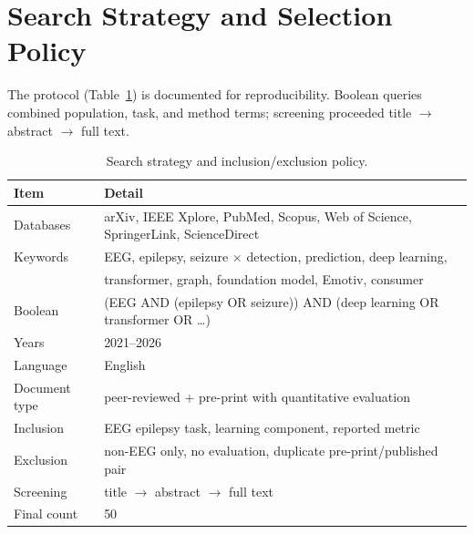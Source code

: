 \section{Search Strategy and Selection Policy}
The protocol (Table~\ref{tab:search}) is documented for reproducibility. Boolean queries combined population, task, and method terms; screening proceeded title $\rightarrow$ abstract $\rightarrow$ full text.
\begin{table}[t]\centering\caption{Search strategy and inclusion/exclusion policy.}\label{tab:search}
\footnotesize\begin{tabular}{ll}\toprule
Item & Detail\\\midrule
Databases & arXiv, IEEE Xplore, PubMed, Scopus, Web of Science, SpringerLink, ScienceDirect\\
Keywords & EEG, epilepsy, seizure $\times$ detection, prediction, deep learning,\\
 & transformer, graph, foundation model, Emotiv, consumer\\
Boolean & (EEG AND (epilepsy OR seizure)) AND (deep learning OR transformer OR \ldots)\\
Years & 2021--2026\\
Language & English\\
Document type & peer-reviewed + pre-print with quantitative evaluation\\
Inclusion & EEG epilepsy task, learning component, reported metric\\
Exclusion & non-EEG only, no evaluation, duplicate pre-print/published pair\\
Screening & title $\rightarrow$ abstract $\rightarrow$ full text\\
Final count & 50\\\bottomrule
\end{tabular}\end{table}

